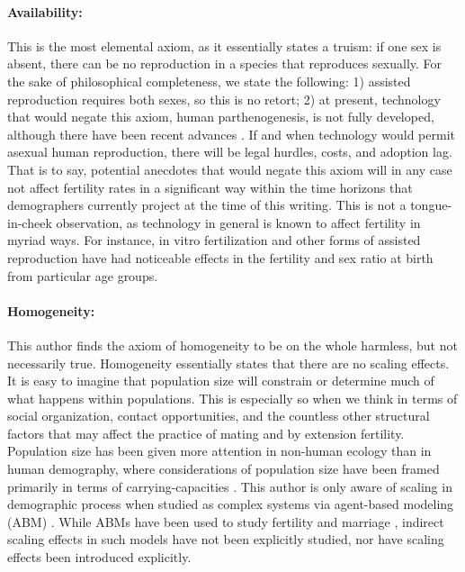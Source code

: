 \paragraph{Availability:} This is the most elemental axiom, as it essentially
states a truism: if one sex is absent, there can be no reproduction in a species
that reproduces sexually. For the sake of philosophical completeness, we state
the following: 1) assisted reproduction requires both sexes, so this is no
retort; 2) at present, technology that would negate this axiom, human
parthenogenesis, is not fully developed, although there have been recent
advances \citep{revazova2007patient}. If and when technology would permit
asexual human reproduction, there will be legal hurdles, costs, and adoption lag. 
That is to say, potential anecdotes that would negate this axiom
will in any case not affect fertility rates in a significant way within the time
horizons that demographers currently project at the time of this writing. This
is not a tongue-in-cheek observation, as technology in general is known to affect fertility in myriad
ways. For instance, in vitro fertilization and other forms of assisted
reproduction have had noticeable effects in the fertility and sex ratio at birth from particular
age groups.

\paragraph{Homogeneity:} This author finds the axiom of homogeneity to be on the
whole harmless, but not necessarily true. Homogeneity essentially states that
there are no scaling effects. It is easy to imagine that population size will
constrain or determine much of what happens within populations. This is
especially so when we think in terms of social organization, contact
opportunities, and the countless other structural factors that may affect the
practice of mating and by extension fertility. Population size has been
given more attention in non-human ecology \citep{donalson1999population} than in
human demography, where considerations of population size have been framed
primarily in terms of carrying-capacities \citep[see
e.g., ][]{cohen1995human,hopfenberg2003human}. This author is only aware of
scaling in demographic process when studied as complex systems via agent-based modeling (ABM) \citep[e.g., ][]{bruch2010scaling}. While ABMs have
been used to study fertility and marriage \citep{billari2002wedding},
indirect scaling effects in such models have not been explicitly studied, nor
have scaling effects been introduced explicitly.


